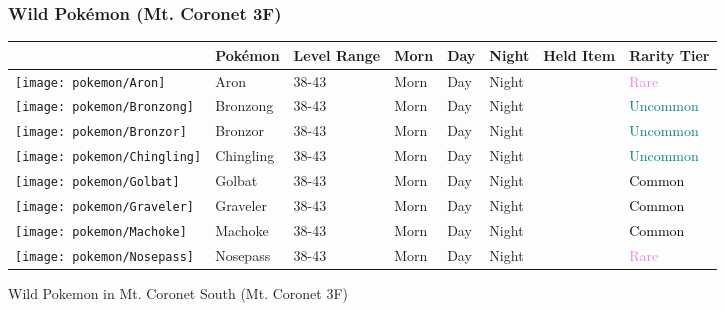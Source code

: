 \subsubsection{Wild Pokémon (Mt. Coronet 3F)}%
\label{ssubsec:WildPokmon(Mt.Coronet3F)}%
\begin{longtable}{||l l l l l l l l||}%
\hline%
&Pokémon&Level Range&Morn&Day&Night&Held Item&Rarity Tier\\%
\hline%
\endhead%
\hline%
\texttt{[image: pokemon/Aron]}&Aron&38{-}43&Morn&Day&Night&&\textcolor{violet}{%
Rare%
}\\%
\hline%
\texttt{[image: pokemon/Bronzong]}&Bronzong&38{-}43&Morn&Day&Night&&\textcolor{teal}{%
Uncommon%
}\\%
\hline%
\texttt{[image: pokemon/Bronzor]}&Bronzor&38{-}43&Morn&Day&Night&&\textcolor{teal}{%
Uncommon%
}\\%
\hline%
\texttt{[image: pokemon/Chingling]}&Chingling&38{-}43&Morn&Day&Night&&\textcolor{teal}{%
Uncommon%
}\\%
\hline%
\texttt{[image: pokemon/Golbat]}&Golbat&38{-}43&Morn&Day&Night&&\textcolor{black}{%
Common%
}\\%
\hline%
\texttt{[image: pokemon/Graveler]}&Graveler&38{-}43&Morn&Day&Night&&\textcolor{black}{%
Common%
}\\%
\hline%
\texttt{[image: pokemon/Machoke]}&Machoke&38{-}43&Morn&Day&Night&&\textcolor{black}{%
Common%
}\\%
\hline%
\texttt{[image: pokemon/Nosepass]}&Nosepass&38{-}43&Morn&Day&Night&&\textcolor{violet}{%
Rare%
}\\%
\hline%
\end{longtable}%
\caption{Wild Pokemon in Mt. Coronet South (Mt. Coronet 3F)}